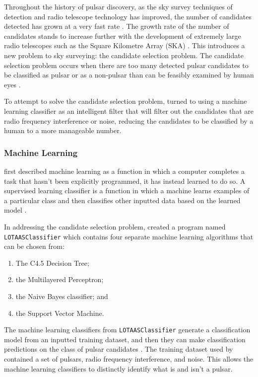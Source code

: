 \documentclass{article}
\begin{document}
Throughout the history of pulsar discovery, as the sky survey techniques of detection and radio telescope technology has improved, the number of candidates detected has grown at a very fast rate \autocite{lyon}. The growth rate of the number of candidates stands to increase further with the development of extremely large radio telescopes such as the Square Kilometre Array (SKA) \autocite{lyon}. This introduces a new problem to sky surveying: the candidate selection problem. The candidate selection problem occurs when there are too many detected pulsar candidates to be classified as pulsar or as a non-pulsar than can be feasibly examined by human eyes \autocite{lyon}.

To attempt to solve the candidate selection problem, \textcite{lyon} turned to using a machine learning classifier as an intelligent filter that will filter out the candidates that are radio frequency interference or noise, reducing the candidates to be classified by a human to a more manageable number.

\subsubsection{Machine Learning}

\textcite{valiant} first described machine learning as a function in which a computer completes a task that hasn't been explicitly programmed, it has instead learned to do so. A supervised learning classifier is a function in which a machine learns examples of a particular class and then classifies other inputted data based on the learned model \autocite{dietterich}.

In addressing the candidate selection problem, \textcite{lyon} created a program named \verb|LOTAASClassifier| which contains four separate machine learning algorithms that can be chosen from:
\begin{enumerate}
    \item The C4.5 Decision Tree;
    \item the Multilayered Perceptron;
    \item the Naive Bayes classifier; and
    \item the Support Vector Machine.
\end{enumerate}

The machine learning classifiers from \verb|LOTAASClassifier| generate a classification model from an inputted training dataset, and then they can make classification predictions on the class of pulsar candidates \autocite{lyon}. The training dataset used by \textcite{lyon} contained a set of pulsars, radio frequency interference, and noise. This allows the machine learning classifiers to distinctly identify what is and isn't a pulsar.
\end{document}
